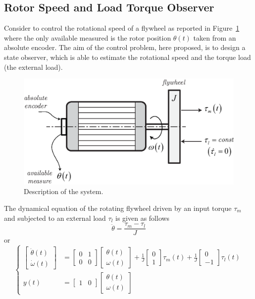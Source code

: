 \documentclass[11pt,a4paper,oneside]{book}
\numberwithin{equation}{section}
\theoremstyle{it}
\theoremstyle{definition}
\begin{document}
\subsection{Rotor Speed and Load Torque Observer}
	Consider to control the rotational speed of a flywheel as reported in Figure~\ref{plant_wheel} where the only available measured is the rotor position $\theta(t)$ taken from an absolute encoder. The aim of the control problem, here proposed, is to design a state observer, which is able to estimate the rotational speed and the torque load (the external load).
	\begin{figure}[H]
		\centering
		\includegraphics[width = 320pt, keepaspectratio]{figures/dynamical_plant.eps}
		\captionsetup{width=0.5\textwidth, font=small}		
		\caption{Description of the system.}
		\label{plant_wheel}
	\end{figure}
	The dynamical equation of the rotating flywheel driven by an input torque $\tau_m$ and subjected to an external load $\tau_l$ is given as follows
	\begin{equation} \label{example_1_eq1}
		\ddot{\theta}=\frac{\tau_m-\tau_l}{J}
	\end{equation} 
	or 
	\begin{equation} \label{}
		\left\lbrace \begin{aligned}
			\begin{bmatrix}
				\dot{\theta}(t) \\[6pt]
				\dot{\omega}(t)
			\end{bmatrix}&=
			\begin{bmatrix}
				0 & 1 \\[6pt]
				0 & 0
			\end{bmatrix}
			\begin{bmatrix}
				\theta(t) \\[6pt]
				\omega(t) 
			\end{bmatrix}+\frac{1}{J}
			\begin{bmatrix}
				0 \\[6pt]
				1
			\end{bmatrix}\tau_m(t) +\frac{1}{J}
			\begin{bmatrix}
				0 \\[6pt]
				-1
			\end{bmatrix}\tau_l(t) \\[6pt]
			y(t) &= \begin{bmatrix} 1 & 0\end{bmatrix}	\begin{bmatrix} \theta(t) \\ \omega(t) \end{bmatrix}
		\end{aligned}\right. 
	\end{equation}
\end{document}
